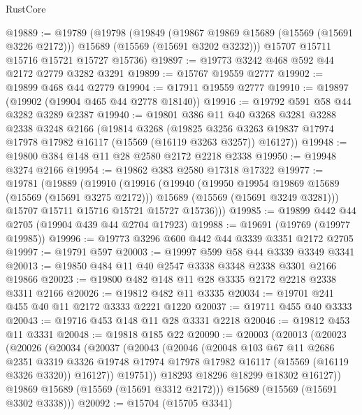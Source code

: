 \begin{lexlean}{RustCore}
\begin{coremodule}
@19889 := @19789
    (@19798
      (@19849
        (@19867 @19869 @15689 (@15569 (@15691 @3226 @2172)))
        @15689
        (@15569 (@15691 @3202 @3232)))
      @15707
      @15711
      @15716
      @15721
      @15727
      @15736)
@19897 := @19773 @3242 @468 @592 @44 @2172 @2779 @3282 @3291
@19899 := @15767 @19559 @2777
@19902 := @19899 @468 @44 @2779
@19904 := @17911 @19559 @2777
@19910 := @19897 (@19902 (@19904 @465 @44 @2778 @18140))
@19916 := @19792 @591 @58 @44 @3282 @3289 @2387
@19940 := @19801
    @386
    @11
    @40
    @3268
    @3281
    @3288
    @2338
    @3248
    @2166
    (@19814
      @3268
      (@19825 @3256 @3263 @19837 @17974 @17978 @17982 @16117 (@15569 (@16119 @3263 @3257)) @16127))
@19948 := @19800 @384 @148 @11 @28 @2580 @2172 @2218 @2338
@19950 := @19948 @3274 @2166
@19954 := @19862 @383 @2580 @17318 @17322
@19977 := @19781
    (@19889
      (@19910
        (@19916
          (@19940
            (@19950 @19954 @19869 @15689 (@15569 (@15691 @3275 @2172)))
            @15689
            (@15569 (@15691 @3249 @3281)))
          @15707
          @15711
          @15716
          @15721
          @15727
          @15736)))
@19985 := @19899 @442 @44 @2705 (@19904 @439 @44 @2704 @17923)
@19988 := @19691 (@19769 (@19977 @19985))
@19996 := @19773 @3296 @600 @442 @44 @3339 @3351 @2172 @2705
@19997 := @19791 @597
@20003 := @19997 @599 @58 @44 @3339 @3349 @3341
@20013 := @19850 @484 @11 @40 @2547 @3338 @3348 @2338 @3301 @2166 @19866
@20023 := @19800 @482 @148 @11 @28 @3335 @2172 @2218 @2338 @3311 @2166
@20026 := @19812 @482 @11 @3335
@20034 := @19701 @241 @455 @40 @11 @2172 @3333 @2221 @1220
@20037 := @19711 @455 @40 @3333
@20043 := @19716 @453 @148 @11 @28 @3331 @2218
@20046 := @19812 @453 @11 @3331
@20048 := @19818 @185 @22
@20090 := @20003
    (@20013
      (@20023
        (@20026
          (@20034
            (@20037
              (@20043
                (@20046
                  (@20048
                    @103
                    @67
                    @11
                    @2686
                    @2351
                    @3319
                    @3326
                    @19748
                    @17974
                    @17978
                    @17982
                    @16117
                    (@15569 (@16119 @3326 @3320))
                    @16127))
                @19751))
            @18293
            @18296
            @18299
            @18302
            @16127))
        @19869
        @15689
        (@15569 (@15691 @3312 @2172)))
      @15689
      (@15569 (@15691 @3302 @3338)))
@20092 := @15704 (@15705 @3341)

\end{coremodule}
\end{lexlean}
